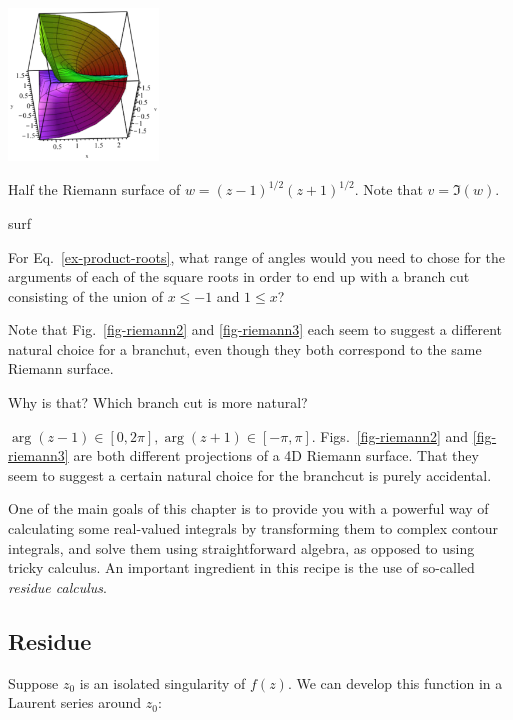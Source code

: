 \begin{exer}
\begin{marginfigure}[0.cm]
\centering
\includegraphics[width=4cm]{complex/figures/riemann3}
\caption{Half the Riemann surface of $w=(z-1)^{1/2}(z+1)^{1/2}$. Note that $v=\Im(w)$. }
\label{fig-riemann3}surf
\end{marginfigure}

For Eq.~\ref{ex-product-roots}, what range of angles would you need to chose for the arguments of each of the square roots in order to end up with a branch cut consisting of the union of  $x \le -1$ and $1 \le x$?


Note that Fig.~\ref{fig-riemann2} and \ref{fig-riemann3} each seem to suggest a different natural choice for a branchut, even though they both correspond to the same Riemann surface.


Why is that? Which branch cut is more natural?
  \begin{sol}
    $\arg(z-1) \in [0, 2 \pi], \arg(z+1) \in [-\pi,\pi]$. Figs.~\ref{fig-riemann2} and \ref{fig-riemann3} are both different projections of a 4D Riemann surface. That they seem to suggest a certain natural choice for the branchcut is purely accidental.
\end{sol}
\end{exer}

\pagebreak



One of the main goals of this chapter is to provide you with a powerful way of calculating some real-valued integrals by transforming them to complex contour integrals, and solve them using straightforward algebra, as opposed to using tricky calculus. An important ingredient in this recipe is the use of so-called \emph{residue calculus}.

\subsection*{Residue}

Suppose $z_0$ is an isolated singularity of $f(z)$. We can develop this function in a Laurent series around $z_0$:

